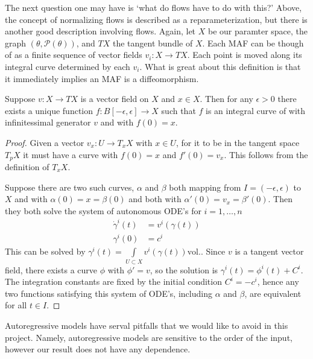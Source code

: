 The next question one may have is `what do flows have to do with this?' Above, the concept of normalizing flows is described as a reparameterization, but there is another good description involving flows. Again, let $X$ be our paramter space, the graph $(\theta,\mathcal{P}(\theta))$, and $TX$ the tangent bundle of $X$. Each MAF can be though of as a finite sequence of vector fields $v_i:X \rightarrow TX$. Each point is moved along its integral curve determined by each $v_i$. What is great about this definition is that it immediately implies an MAF is a diffeomorphism. 
\begin{prop}
Suppose $v:X \rightarrow TX$ is a vector field on $X$ and $x \in X$. Then for any $\epsilon>0$ there exists a unique function $f:B[-\epsilon,\epsilon]\rightarrow X$ such that $f$ is an integral curve of with infinitessimal generator $v$ and with $f(0) = x$.  
\end{prop}
\begin{proof}
Given a vector $v_x:U\rightarrow T_x X$ with $x\in U$, for it to be in the tangent space $T_pX$ it must have a curve with $f(0)=x$ and $f'(0)=v_x$. This follows from the definition of $T_xX$.

Suppose there are two such curves, $\alpha$ and $\beta$ both mapping from $I=(-\epsilon,\epsilon)$ to $X$ and with $\alpha(0) = x = \beta(0)$ and both with $\alpha'(0) = v_x = \beta'(0)$. Then they both solve the system of autonomous ODE's for $i=1,\dots,n$
\begin{equation}
\begin{split}
	\dot{\gamma}^i(t) &= v^i(\gamma(t)) \\
	\gamma^i(0) &= c^i
\end{split}
\end{equation}
This can be solved by $\gamma^i(t) = \int\limits_{U\subset X}v^i(\gamma(t))\text{vol.}$. Since $v$ is a tangent vector field, there exists a curve $\phi$ with $\phi' = v$, so the solution is $\gamma^i(t) = \phi^i(t)+C^i$. The integration constants are fixed by the initial condition $C^i=-c^i$, hence any two functions satisfying this system of ODE's, including $\alpha$ and $\beta$, are equivalent for all $t\in I$.
\end{proof}
Autoregressive models have serval pitfalls that we would like to avoid in this project. Namely, autoregressive models are sensitive to the order of the input, however our result does not have any dependence. 

